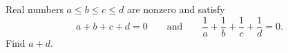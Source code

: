 Real numbers $a\le b\le c\le d$ are nonzero and satisfy
\[
a+b+c+d=0\qquad\text{and}\qquad\dfrac{1}{a}+\dfrac{1}{b}+\dfrac{1}{c}+\dfrac{1}{d}=0 .
\]
Find $a+d$.
